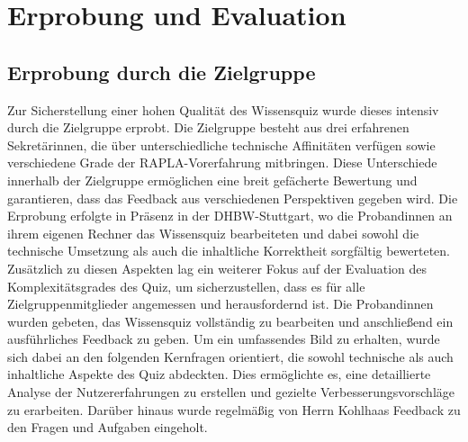 \chapter{Erprobung und Evaluation}
\section{Erprobung durch die Zielgruppe}
Zur Sicherstellung einer hohen Qualität des Wissensquiz wurde dieses intensiv durch die Zielgruppe erprobt. Die Zielgruppe besteht aus drei erfahrenen Sekretärinnen, die über unterschiedliche technische Affinitäten verfügen sowie verschiedene Grade der RAPLA-Vorerfahrung mitbringen. Diese Unterschiede innerhalb der Zielgruppe ermöglichen eine breit gefächerte Bewertung und garantieren, dass das Feedback aus verschiedenen Perspektiven gegeben wird. Die Erprobung erfolgte in Präsenz in der DHBW-Stuttgart, wo die Probandinnen an ihrem eigenen Rechner das Wissensquiz bearbeiteten und dabei sowohl die technische Umsetzung als auch die inhaltliche Korrektheit sorgfältig bewerteten. Zusätzlich zu diesen Aspekten lag ein weiterer Fokus auf der Evaluation des Komplexitätsgrades des Quiz, um sicherzustellen, dass es für alle Zielgruppenmitglieder angemessen und herausfordernd ist.
Die Probandinnen wurden gebeten, das Wissensquiz vollständig zu bearbeiten und anschließend ein ausführliches Feedback zu geben. Um ein umfassendes Bild zu erhalten, wurde sich dabei an den folgenden Kernfragen orientiert, die sowohl technische als auch inhaltliche Aspekte des Quiz abdeckten. Dies ermöglichte es, eine detaillierte Analyse der Nutzererfahrungen zu erstellen und gezielte Verbesserungsvorschläge zu erarbeiten.
Darüber hinaus wurde regelmäßig von Herrn Kohlhaas Feedback zu den Fragen und Aufgaben eingeholt.

